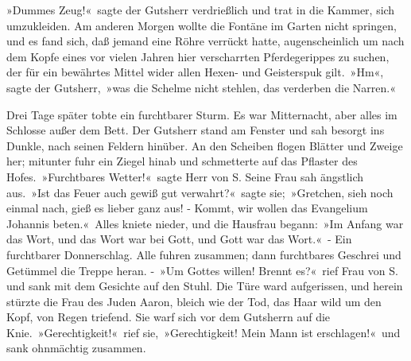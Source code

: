 »Dummes Zeug!« sagte der Gutsherr verdrießlich und trat in die Kammer, sich umzukleiden. Am anderen Morgen wollte die Fontäne im Garten nicht springen, und es fand sich, daß jemand eine Röhre verrückt hatte, augenscheinlich um nach dem Kopfe eines vor vielen Jahren hier verscharrten Pferdegerippes zu suchen, der für ein bewährtes Mittel wider allen Hexen- und Geisterspuk gilt. »Hm«, sagte der Gutsherr, »was die Schelme nicht stehlen, das verderben die Narren.«

Drei Tage später tobte ein furchtbarer Sturm. Es war Mitternacht, aber alles im Schlosse außer dem Bett. Der Gutsherr stand am Fenster und sah besorgt ins Dunkle, nach seinen Feldern hinüber. An den Scheiben flogen Blätter und Zweige her; mitunter fuhr ein Ziegel hinab und schmetterte auf das Pflaster des Hofes. »Furchtbares Wetter!« sagte Herr von S. Seine Frau sah ängstlich aus. »Ist das Feuer auch gewiß gut verwahrt?« sagte sie; »Gretchen, sieh noch einmal nach, gieß es lieber ganz aus! - Kommt, wir wollen das Evangelium Johannis beten.« Alles kniete nieder, und die Hausfrau begann: »Im Anfang war das Wort, und das Wort war bei Gott, und Gott war das Wort.« - Ein furchtbarer Donnerschlag. Alle fuhren zusammen; dann furchtbares Geschrei und Getümmel die Treppe heran. - »Um Gottes willen! Brennt es?« rief Frau von S. und sank mit dem Gesichte auf den Stuhl. Die Türe ward aufgerissen, und herein stürzte die Frau des Juden Aaron, bleich wie der Tod, das Haar wild um den Kopf, von Regen triefend. Sie warf sich vor dem Gutsherrn auf die Knie. »Gerechtigkeit!« rief sie, »Gerechtigkeit! Mein Mann ist erschlagen!« und sank ohnmächtig zusammen.

